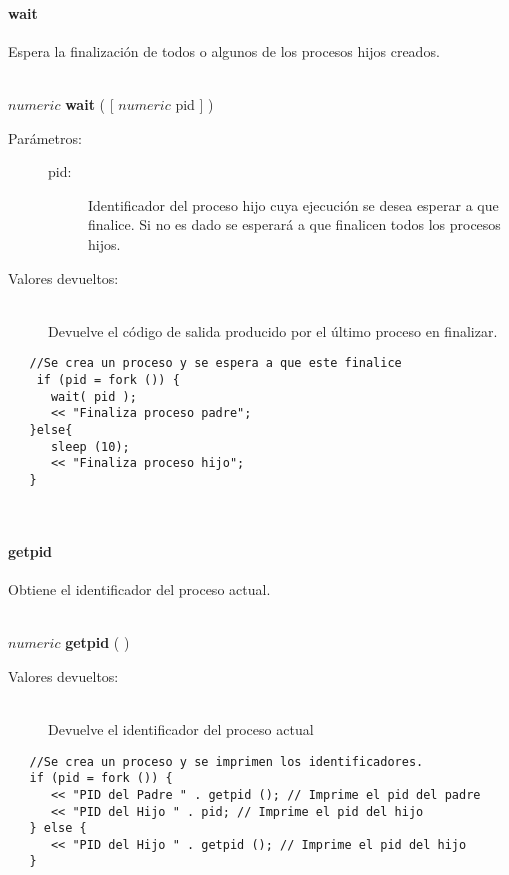 \paragraph{wait}
Espera la finalización de todos o algunos de los procesos hijos creados.


\hfill \\ $numeric$ \textbf{wait} ( [ $numeric$ pid ] )  
\begin{description}
\item [Parámetros:] \hfill 
   \begin{description}
   \item[pid:] Identificador del proceso hijo cuya ejecución se desea esperar a que 
   finalice. Si no es dado se esperará a que finalicen todos los procesos hijos.
   \end{description}
\item[Valores devueltos:] \hfill \\
   Devuelve el código de salida producido por el último proceso en finalizar.
\end{description}
     
\begin{lstlisting}  
   //Se crea un proceso y se espera a que este finalice
    if (pid = fork ()) {
      wait( pid );
      << "Finaliza proceso padre";
   }else{
      sleep (10);
      << "Finaliza proceso hijo";
   }
\end{lstlisting}
\hfill\\ 

\paragraph{getpid}
Obtiene el identificador del proceso actual.


\hfill \\ $numeric$ \textbf{getpid} ( )  
\begin{description}
\item[Valores devueltos:] \hfill \\
   Devuelve el identificador del proceso actual
\end{description}
     
\begin{lstlisting}  
   //Se crea un proceso y se imprimen los identificadores.
   if (pid = fork ()) {
      << "PID del Padre " . getpid (); // Imprime el pid del padre
      << "PID del Hijo " . pid; // Imprime el pid del hijo
   } else {
      << "PID del Hijo " . getpid (); // Imprime el pid del hijo
   }
\end{lstlisting}
\hfill\\ 

